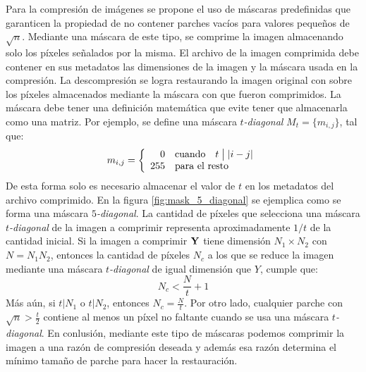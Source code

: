 Para la compresi\'on de im\'agenes se propone el uso de m\'ascaras predefinidas que garanticen la propiedad de no contener parches vac\'ios para valores pequeños de $\sqrt{n}$. Mediante una m\'ascara de este tipo, se comprime la imagen almacenando solo los p\'ixeles señalados por la misma. El archivo de la imagen comprimida debe contener en sus metadatos las dimensiones de la imagen y la m\'ascara usada en la compresi\'on. La descompresi\'on se logra restaurando la imagen original con \SOP sobre los p\'ixeles almacenados mediante la m\'ascara con que fueron comprimidos. La m\'ascara debe tener una definici\'on matem\'atica que evite tener que almacenarla como una matriz. Por ejemplo, se define una m\'ascara $t$\textit{-diagonal} $M_t = \{m_{i,j}\}$, tal que:
\begin{equation}
	m_{i, j} = \left\{\begin{array}{rl}
		0 & \mbox{cuando} \quad t \bigm| |i - j|\\
		255 & \mbox{para el resto} \\
	\end{array}\right.
\end{equation}
De esta forma solo es necesario almacenar el valor de $t$ en los metadatos del archivo comprimido. En la figura \ref{fig:mask_5_diagonal} se ejemplica como se forma una m\'ascara $5$\textit{-diagonal}. La cantidad de p\'ixeles que selecciona una m\'ascara $t$\textit{-diagonal} de la imagen a comprimir representa aproximadamente $1/t$ de la cantidad inicial. Si la imagen a comprimir $\mathbf{Y}$ tiene dimensi\'on $N_1 \times N_2$ con $N = N_1N_2$, entonces la cantidad de p\'ixeles $N_c$ a los que se reduce la imagen mediante una m\'ascara $t$\textit{-diagonal} de igual dimensi\'on que $Y$, cumple que:
\begin{equation}
	N_c < \frac{N}{t} + 1
\end{equation}
M\'as a\'un, si $t | N_1$ o $t | N_2$, entonces $N_c = \frac{N}{t}$. Por otro lado, cualquier parche con $\sqrt{n} > \frac{t}{2}$ contiene al menos un p\'ixel no faltante cuando se usa una m\'ascara $t$\textit{-diagonal}. En conlusi\'on, mediante este tipo de m\'ascaras podemos comprimir la imagen a una raz\'on de compresi\'on deseada y adem\'as esa raz\'on determina el m\'inimo tamaño de parche para hacer la restauraci\'on.
